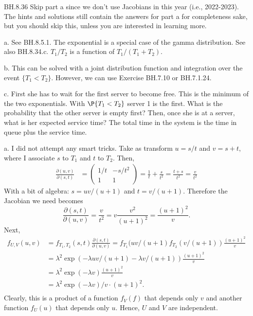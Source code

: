 
\setcounter{theorem}{35}
\begin{exercise} BH.8.36 Skip part a since we don't use Jacobians in this year (i.e., 2022-2023).
The hints and solutions still contain the answers for part a for completeness sake, but you should
skip this, unless you are interested in learning more.

\begin{hint}
a. See BH.8.5.1. The exponential is a special case of the gamma distribution. See also BH.8.34.c. $T_1/T_2$ is a function of $T_1/(T_1+T_2)$.

b. This can be solved with a joint distribution function and integration over the event $\{T_1<T_2\}$. However, we can use Exercise BH.7.10 or BH.7.1.24.

c. First she has to wait for the first server to become free. This is the minimum of the two exponentials.
With $\P{T_1<T_2}$ server 1 is the first.
What is the probability that the other server is empty first? Then, once she is at a server, what is her expected service time? The total time in the system is the time in queue plus the service time.
\end{hint}
\begin{solution}
a. I did not attempt any smart tricks. Take as transform $u=s/t$ and $v=s+t$, where I associate $s$ to $T_{1}$ and $t$  to $T_2$. Then,
\begin{align*}
\frac{\partial (u,v)}{\partial (s,t)} &=
  \begin{pmatrix}
    1/t & -s/t^{2} \\
1 & 1
  \end{pmatrix} = \frac 1 t + \frac{s}{t^{2}} = \frac{t+s}{t^{2}} = \frac{v}{t^{2}}
\end{align*}
With a bit of algebra: $s=uv/(u+1)$ and $t=v/(u+1)$.
Therefore the Jacobian we need becomes
\begin{equation}
\label{eq:12}
\frac{\partial (s,t)}{\partial (u,v)} = \frac{v}{t^{2}} = v \frac{v^2}{(u+1)^2} = \frac{(u+1)^{2}}{v}.
\end{equation}
Next,
\begin{align*}
  f_{U, V}(u,v) &= f_{T_1,T_2}(s,t) \frac{\partial (s,t)}{\partial (u,v)}
  =  f_{T_1}(uv/(u+1) f_{T_2}(v/(u+1)) \frac{(u+1)^{2}}{v} \\
  &=  \lambda^{2} \exp(-\lambda uv/(u+1) - \lambda v/(u+1)) \frac{(u+1)^{2}}{v} \\
  &=  \lambda^{2} \exp(-\lambda v) \frac{(u+1)^{2}}{v} \\
  &=  \lambda^{2} \exp(-\lambda v)/v \cdot  (u+1)^{2}. \\
\end{align*}
Clearly, this is a product of a function $f_{V}(f)$ that depends only  $v$ and another function $f_U(u)$ that depends  only $u$. Hence, $U$ and $V$ are independent.


\end{solution}
\end{exercise}
